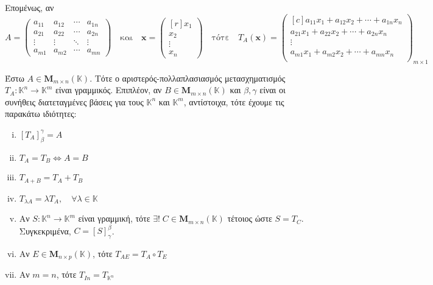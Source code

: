 Επομένως, αν 
\[
  A = 
  \begin{pmatrix}
    a_{11} & a_{12} & \cdots & a_{1n} \\
    a_{21} & a_{22} & \cdots & a_{2n} \\
    \vdots & \vdots & \ddots & \vdots \\
    a_{m1} & a_{m2} & \cdots & a_{mn} 
  \end{pmatrix} \quad \text{και} \quad \mathbf{x} = 
  \begin{pmatrix*}[r] x_{1} \\ x_{2} \\ \vdots \\ x_{n} \end{pmatrix*}
  \quad \text{τότε} \quad T_{A}(\mathbf{x}) = 
  \begin{pmatrix*}[c]
    a_{11} x_{1} + a_{12} x_{2} + \cdots + a_{1n}x_{n} \\
    a_{21} x_{1} + a_{22} x_{2} + \cdots + a_{2n}x_{n} \\ 
    \vdots \\
    a_{m1} x_{1} + a_{m2} x_{2} + \cdots + a_{mn}x_{n} \\ 
  \end{pmatrix*}_{m \times 1}
\] 

\begin{thm}
  Έστω $ A \in \textbf{M}_{m \times n}(\mathbb{K}) $. Τότε ο αριστερός-πολλαπλασιασμός
  μετασχηματισμός $ T_{A} \colon \mathbb{K}^{n} \to \mathbb{K}^{m} $ 
  είναι γραμμικός. Επιπλέον, αν $ B \in \textbf{M}_{m \times n}(\mathbb{K}) $ 
  και $ \beta , \gamma $ είναι οι συνήθεις διατεταγμένες βάσεις για τους 
  $ \mathbb{K}^{n} $ και $ \mathbb{K}^{m} $, αντίστοιχα, τότε έχουμε τις παρακάτω 
  ιδιότητες:
  \begin{enumerate}[i)]
    \item $ [T_{A}]_{\beta}^{\gamma} = A $
    \item $ T_{A} = T_{B} \Leftrightarrow A = B $ 
    \item $ T_{A+B} = T_{A} + T_{B} $
    \item $ T_{\lambda A} = \lambda T_{A}, \quad \forall \lambda \in \mathbb{K} $
    \item Αν $ S \colon \mathbb{K}^{n} \to \mathbb{K}^{m} $ είναι γραμμική, τότε 
      $ \exists ! \; C \in \textbf{M}_{m \times n}(\mathbb{K}) $ τέτοιος ώστε 
      $ S=T_{C} $.  Συγκεκριμένα, $ C = [S]_{\gamma}^{\beta} $.
    \item Αν $ E \in \textbf{M}_{n \times p}(\mathbb{K}) $, τότε $ T_{AE} = T_{A} 
      \circ T_{E} $ 
    \item Αν $ m=n $, τότε $ T_{I{n}} = T_{\mathbb{K}^{n}} $
  \end{enumerate}
\end{thm}

